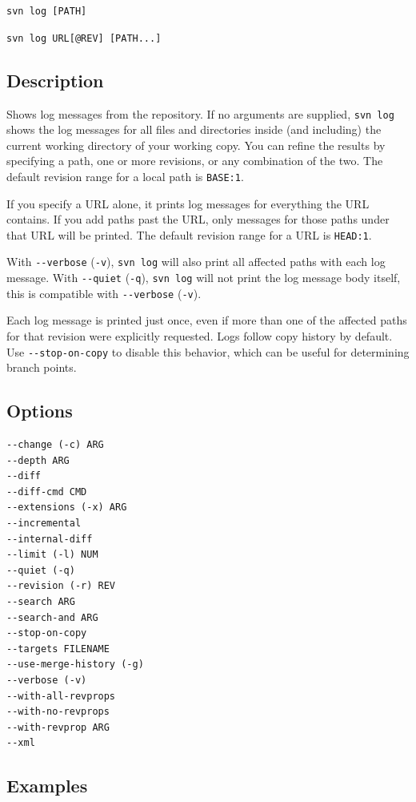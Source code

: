 \texttt{svn\ log\ {[}PATH{]}}

\texttt{svn\ log\ URL{[}@REV{]}\ {[}PATH...{]}}

\subsection{Description}

Shows log messages from the repository. If no arguments are supplied,
\texttt{svn\ log} shows the log messages for all files and directories
inside (and including) the current working directory of your working
copy. You can refine the results by specifying a path, one or more
revisions, or any combination of the two. The default revision range for
a local path is \texttt{BASE:1}.

If you specify a URL alone, it prints log messages for everything the
URL contains. If you add paths past the URL, only messages for those
paths under that URL will be printed. The default revision range for a
URL is \texttt{HEAD:1}.

With \texttt{-\/-verbose} (\texttt{-v}), \texttt{svn\ log} will also
print all affected paths with each log message. With \texttt{-\/-quiet}
(\texttt{-q}), \texttt{svn\ log} will not print the log message body
itself, this is compatible with \texttt{-\/-verbose} (\texttt{-v}).

Each log message is printed just once, even if more than one of the
affected paths for that revision were explicitly requested. Logs follow
copy history by default. Use \texttt{-\/-stop-on-copy} to disable this
behavior, which can be useful for determining branch points.

\subsection{Options}

\begin{verbatim}
--change (-c) ARG
--depth ARG
--diff
--diff-cmd CMD
--extensions (-x) ARG
--incremental
--internal-diff
--limit (-l) NUM
--quiet (-q)
--revision (-r) REV
--search ARG
--search-and ARG
--stop-on-copy
--targets FILENAME
--use-merge-history (-g)
--verbose (-v)
--with-all-revprops
--with-no-revprops
--with-revprop ARG
--xml
\end{verbatim}

\subsection{Examples}

